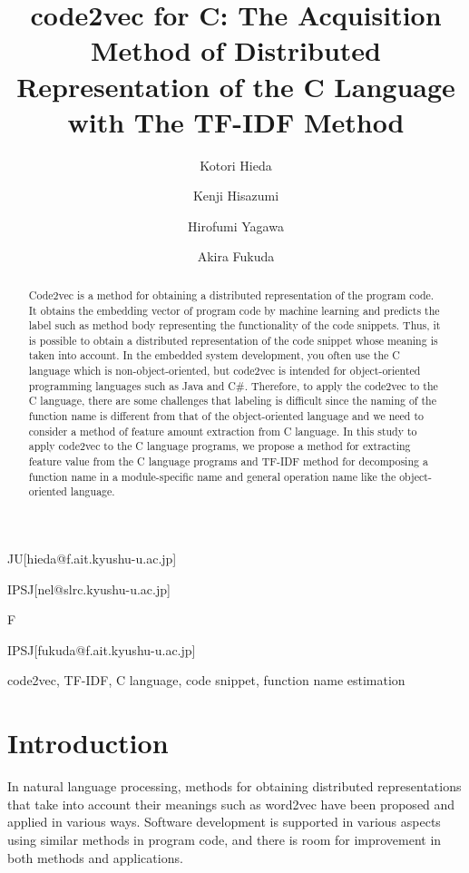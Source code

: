 \documentclass[JIP]{apris}
\begin{document}
\title{code2vec for C: The Acquisition Method of Distributed Representation of the C Language with The TF-IDF Method}


\author{Kotori Hieda}{JU}[hieda@f.ait.kyushu-u.ac.jp]
\author{Kenji Hisazumi}{IPSJ}[nel@slrc.kyushu-u.ac.jp]
\author{Hirofumi Yagawa}{F}
\author{Akira Fukuda}{IPSJ}[fukuda@f.ait.kyushu-u.ac.jp]


\begin{abstract}
Code2vec is a method for obtaining a distributed representation of the program code. It obtains the embedding vector of program code by machine learning and predicts the label such as method body representing the functionality of the code snippets. Thus, it is possible to obtain a distributed representation of the code snippet whose meaning is taken into account. In the embedded system development, you often use the C language which is non-object-oriented, but code2vec is intended for object-oriented programming languages ​​such as Java and C\#. Therefore, to apply the code2vec to the C language,  there are some challenges that labeling is difficult since the naming of the function name is different from that of the object-oriented language and we need to consider a method of feature amount extraction from C language. In this study to apply code2vec to the C language programs, we propose a method for extracting feature value from the C language programs and TF-IDF method for decomposing a function name in a module-specific name and general operation name like the object-oriented language.
\end{abstract}

\begin{keyword}
code2vec, TF-IDF, C language, code snippet, function name estimation
\end{keyword}

\maketitle

\section{Introduction}
In natural language processing, methods for obtaining distributed representations that take into account their meanings such as word2vec have been proposed and applied in various ways.
Software development is supported in various aspects using similar methods in program code, and there is room for improvement in both methods and applications.
\end{document}

